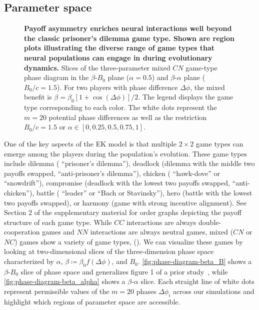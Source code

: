 \documentclass[pdflatex,lineno,referee,sn-nature]{sn-jnl}
\begin{document}
\subsection{Parameter space}
\begin{figure*}
  \centering
  \begin{subcaptiongroup}
      {\label{fig:phase-diagram-beta_alpha}\captiontext*{}}{%
      {\label{fig:phase-diagram-beta_B}\captiontext*{}}{%
    {}%
  }}
  \end{subcaptiongroup}
  \caption{
    \textbf{
      Payoff asymmetry enriches neural interactions
      well beyond the classic prisoner's dilemma game type.
      Shown are region plots illustrating the diverse range
      of game types that neural populations can engage in
      during evolutionary dynamics.
    }
    Slices of the three-parameter mixed $CN$ game-type phase diagram
    in the
    $\beta$-$B_0$ plane ($\alpha = 0.5$)
    and
    $\beta$-$\alpha$ plane ($B_0/c = 1.5$).
    For two players with phase difference $\Delta \phi$,
    the mixed benefit is
    $\beta = \beta_0 [1 + \cos(\Delta \phi)]/2$.
    The legend displays the game type corresponding to each color.
    The white dots represent the $m=20$ potential phase differences
    as well as the restriction
    $B_0/c = 1.5$
    or
    $\alpha \in [0,0.25,0.5,0.75,1]$.
  }\label{fig:phase-diagram}
\end{figure*}

One of the key aspects of the EK model
is that multiple $2 \times 2$ game types can emerge
among the players during the population's evolution.
These game types~\citep{bruns2015names} include
dilemma (\aka{} ``prisoner's dilemma''),
deadlock (dilemma with the middle two payoffs swapped,
\aka{} ``anti-prisoner's dilemma''),
chicken (\aka{} ``hawk-dove'' or ``snowdrift''),
compromise (deadlock with the lowest two payoffs swapped,
\aka{} ``anti-chicken''),
battle (\aka{} ``leader'' or ``Bach or Stavinsky''),
hero (battle with the lowest two payoffs swapped),
or
harmony (game with strong incentive alignment).
See Section 2 of the supplementary material
for order graphs depicting the payoff structure of each game type.
While $CC$ interactions are always double-cooperation games
and $NN$ interactions are always neutral games,
mixed ($CN$ or $NC$) games show a variety of game types,
().
We can visualize these games
by looking at two-dimensional slices
of the three-dimension phase space
characterized by $\alpha$, $\beta \coloneqq \beta_0 f(\Delta \phi)$,
and $B_0$.
\cref{fig:phase-diagram-beta_B} shows a $\beta$-$B_0$ slice of phase space
and generalizes figure 1 of a prior study~\citep{tripp2022evolutionary},
while \cref{fig:phase-diagram-beta_alpha} shows a $\beta$-$\alpha$ slice.
Each straight line of white dots represent permissible values of the $m = 20$ phases
$\Delta \phi_i$ across our simulations
and highlight which regions of parameter space are accessible.
\end{document}
